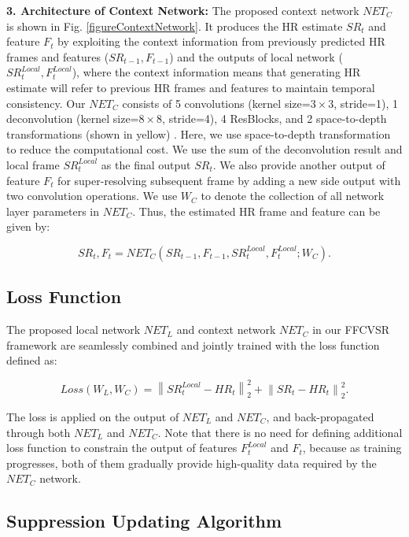 \documentclass[letterpaper]{article} %
\begin{document}
\textbf{3. Architecture of Context Network:} The proposed context network $NET_C$ is shown in Fig. \ref{figureContextNetwork}. It produces the HR estimate $SR_t$ and feature $F_t$ by exploiting the context information from previously predicted HR frames and features ($SR_{t-1}, F_{t-1}$) and the outputs of local network ($SR^{Local}_t, F^{Local}_t$), where the context information means that generating HR estimate will refer to previous HR frames and features to maintain temporal consistency. Our $NET_C$ consists of 5 convolutions (kernel size=$3\times3$, stride=1), 1 deconvolution (kernel size=$8\times8$, stride=4), 4 ResBlocks, and 2 space-to-depth transformations (shown in yellow) \cite{FRVSR2018cvpr}. Here, we use space-to-depth transformation to reduce the computational cost. We use the sum of the deconvolution result and local frame $SR^{Local}_t$ as the final output $SR_t$. We also provide another output of feature $F_t$ for super-resolving subsequent frame by adding a new side output with two convolution operations. We use $W_C$ to denote the collection of all network layer parameters in $NET_C$. Thus, the estimated HR frame and feature can be given by:

\begin{equation}
  SR_t, F_t = NET_C(SR_{t-1}, F_{t-1}, SR^{Local}_t, F^{Local}_t; W_C).
  \label{equationContextNetwork}
\end{equation}


\subsection{Loss Function}


The proposed local network $NET_L$ and context network $NET_C$ in our FFCVSR framework are seamlessly combined and jointly trained with the loss function defined as:

\begin{equation}
  Loss(W_L, W_C) = \left \| SR^{Local}_t - HR_t \right \|^2_2 + \left \| SR_t - HR_t \right \|^2_2.
  \label{LossFunction}
\end{equation}

The loss is applied on the output of $NET_L$ and $NET_C$, and back-propagated through both $NET_L$ and $NET_C$. Note that there is no need for defining additional loss function to constrain the output of features $F^{Local}_t$ and $F_t$, because as training progresses, both of them gradually provide high-quality data required by the $NET_C$ network.


\subsection{Suppression Updating Algorithm}
\end{document}
